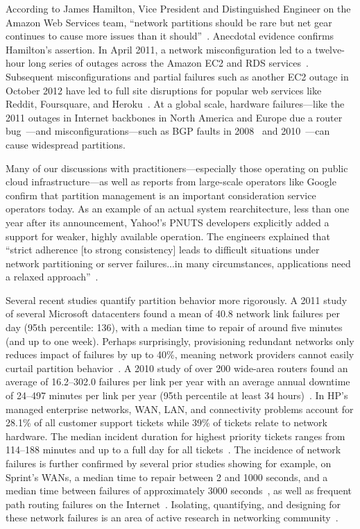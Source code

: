 According to James Hamilton, Vice President and Distinguished Engineer
on the Amazon Web Services team, ``network partitions should be rare
but net gear continues to cause more issues than it
should''~\cite{hamilton-partitions}. Anecdotal evidence confirms
Hamilton's assertion. In April 2011, a network misconfiguration led to
a twelve-hour long series of outages across the Amazon EC2 and RDS
services~\cite{amazon-netpartition}. Subsequent misconfigurations and
partial failures such as another EC2 outage in October 2012 have led
to full site disruptions for popular web services like Reddit,
Foursquare, and Heroku~\cite{ec2-downsites}. At a global scale,
hardware failures---like the 2011 outages in Internet backbones in
North America and Europe due a router
bug~\cite{juniper-partition}---and misconfigurations---such as BGP
faults in 2008~\cite{pakistan-youtube} and
2010~\cite{research-experiment-partition}---can cause widespread
partitions.

Many of our discussions with practitioners---especially those
operating on public cloud infrastructure---as well as reports from
large-scale operators like Google~\cite{dean-keynote} confirm that
partition management is an important consideration service operators
today. As an example of an actual system rearchitecture, less than one
year after its announcement, Yahoo!'s PNUTS developers explicitly
added a support for weaker, highly available operation. The engineers
explained that ``strict adherence [to strong consistency] leads to
difficult situations under network partitioning or server
failures...in many circumstances, applications need a relaxed
approach''~\cite{pnuts-update}.

Several recent studies quantify partition behavior more rigorously. A
2011 study of several Microsoft datacenters found a mean of 40.8
network link failures per day (95th percentile: 136), with a median
time to repair of around five minutes (and up to one week). Perhaps
surprisingly, provisioning redundant networks only reduces impact of
failures by up to 40\%, meaning network providers cannot easily
curtail partition behavior~\cite{sigcomm-dc}. A 2010 study of over 200
wide-area routers found an average of 16.2--302.0 failures per link
per year with an average annual downtime of 24--497 minutes per link
per year (95th percentile at least 34 hours)~\cite{sigcomm-wan}. In
HP's managed enterprise networks, WAN, LAN, and connectivity problems
account for 28.1\% of all customer support tickets while 39\% of
tickets relate to network hardware.  The median incident duration for
highest priority tickets ranges from 114--188 minutes and up to a full
day for all tickets~\cite{turner2012failure}. The incidence of network
failures is further confirmed by several prior studies showing for
example, on Sprint's WANs, a median time to repair between 2 and 1000
seconds, and a median time between failures of approximately 3000
seconds~\cite{ip-backbone-failures}, as well as frequent path routing
failures on the Internet~\cite{labovitz-failures}. Isolating,
quantifying, and designing for these network failures is an area of active
research in networking community~\cite{surviving-failures-bodik,
  uw-failure-networks}.

